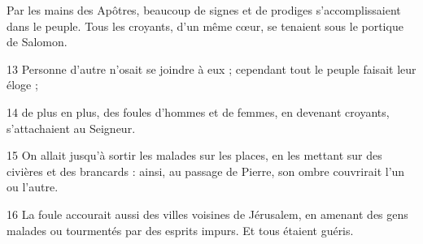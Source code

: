 Par les mains des Apôtres, beaucoup de signes et de prodiges s’accomplissaient dans le peuple. Tous les croyants, d’un même cœur, se tenaient sous le portique de Salomon.

13 Personne d’autre n’osait se joindre à eux ; cependant tout le peuple faisait leur éloge ;

14 de plus en plus, des foules d’hommes et de femmes, en devenant croyants, s’attachaient au Seigneur.

15 On allait jusqu’à sortir les malades sur les places, en les mettant sur des civières et des brancards : ainsi, au passage de Pierre, son ombre couvrirait l’un ou l’autre.

16 La foule accourait aussi des villes voisines de Jérusalem, en amenant des gens malades ou tourmentés par des esprits impurs. Et tous étaient guéris.